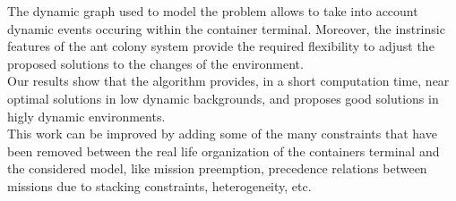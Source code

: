 \documentclass[a4paper,10pt]{article}
\begin{document}
The dynamic graph used to model the problem allows to take into account dynamic events occuring within the container terminal. Moreover, the instrinsic features of the ant colony system provide the required flexibility to adjust the proposed solutions to the changes of the environment.\\

Our results show that the algorithm provides, in a short computation time, near optimal solutions in low dynamic backgrounds, and proposes good solutions in higly dynamic environments.\\

This work can be improved by adding some of the many constraints that have been removed between the real life organization of the containers terminal and the considered model, like mission preemption, precedence relations between missions due to stacking constraints, heterogeneity, etc.  





\end{document}
